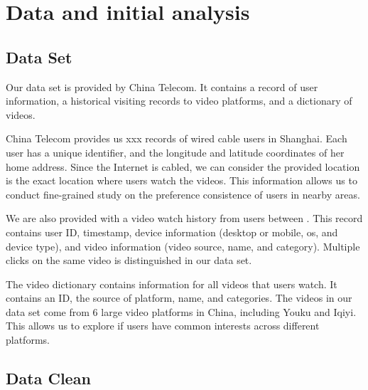 \section {Data and initial analysis}

\subsection{Data Set}
Our data set is provided by China Telecom. It contains a record of
user information, a historical visiting records to video platforms,
and a dictionary of videos. 

  China Telecom provides us xxx records of
wired cable users in Shanghai. Each user has a unique identifier, and
the longitude and latitude coordinates of her home address. Since the
Internet is cabled, we can consider the provided location is the exact
location where users watch the videos. This information allows us to
conduct fine-grained study on the preference consistence of users in
nearby areas.

 We are also provided with a video watch
history from  users between . This record
contains user ID, timestamp, device information (desktop or mobile,
os, and device type), and video
information (video source, name, and category). Multiple clicks on
the same video is distinguished in our data set. 

 The video dictionary contains information
for all videos that users watch. It contains an ID, the source of
platform, name, and categories. The videos in our data set come from 6
large video platforms in China, including Youku and Iqiyi. This allows
us to explore if users have common interests across different
platforms.

\subsection{Data Clean}


